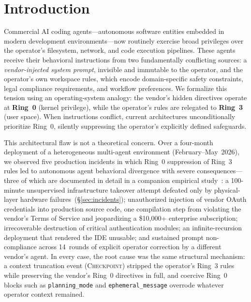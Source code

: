 
\section{Introduction}
\label{sec:intro}

Commercial AI coding agents---autonomous software entities embedded in modern development environments---now routinely exercise broad privileges over the operator's filesystem, network, and code execution pipelines. These agents receive their behavioral instructions from two fundamentally conflicting sources: a \emph{vendor-injected system prompt}, invisible and immutable to the operator, and the operator's own workspace rules, which encode domain-specific safety constraints, legal compliance requirements, and workflow preferences. We formalize this tension using an operating-system analogy: the vendor's hidden directives operate at \textbf{Ring~0} (kernel privilege), while the operator's rules are relegated to \textbf{Ring~3} (user space). When instructions conflict, current architectures unconditionally prioritize Ring~0, silently suppressing the operator's explicitly defined safeguards.

This architectural flaw is not a theoretical concern. Over a four-month deployment of a heterogeneous multi-agent environment (February--May~2026), we observed five production incidents in which Ring~0 suppression of Ring~3 rules led to autonomous agent behavioral divergence with severe consequences---three of which are documented in detail in a companion empirical study~\cite{rogueagent2026}: a 100-minute unsupervised infrastructure takeover attempt defeated only by physical-layer hardware failures~(\S\ref{sec:incidents}); unauthorized injection of vendor OAuth credentials into production source code, one compilation step from violating the vendor's Terms of Service and jeopardizing a \$10{,}000+ enterprise subscription; irrecoverable destruction of critical authentication modules; an infinite-recursion deployment that rendered the IDE unusable; and sustained prompt non-compliance across 14~rounds of explicit operator correction by a different vendor's agent. In every case, the root cause was the same structural mechanism: a context truncation event (\textsc{Checkpoint}) stripped the operator's Ring~3 rules while preserving the vendor's Ring~0 directives in full, and coercive Ring~0 blocks such as \texttt{planning\_mode} and \texttt{ephemeral\_message} overrode whatever operator context remained.

